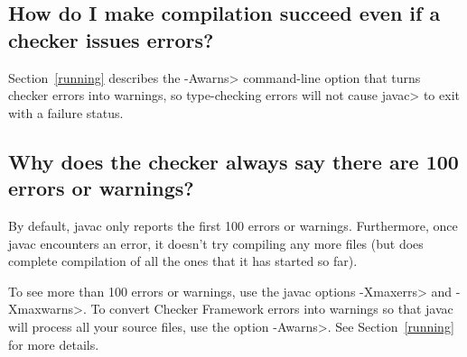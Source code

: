%
%
%
%
%
%
%


\subsection{How do I make compilation succeed even if a checker issues errors?\label{faq-awarns}}

Section~\ref{running} describes the \<-Awarns> command-line
option that turns checker errors into warnings, so type-checking errors
will not cause \<javac> to exit with a failure status.


\subsection{Why does the checker always say there are 100 errors or warnings?\label{faq-100-warnings}}

By default, javac only reports the first 100 errors or warnings.
Furthermore, once javac encounters an error, it doesn't try compiling any
more files (but does complete compilation of all the ones that it has
started so far).

To see more than 100 errors or warnings, use the javac options \<-Xmaxerrs>
and \<-Xmaxwarns>.  To convert Checker Framework errors into warnings so
that javac will process all your source files, use the option \<-Awarns>.
See Section~\ref{running} for more details.


